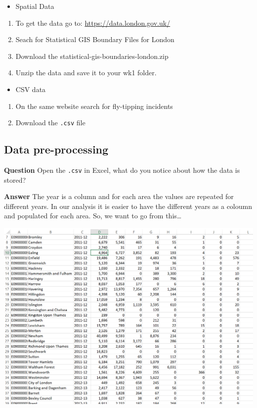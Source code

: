 \documentclass[]{book}
\providecommand{\tightlist}{%
  \setlength{\itemsep}{0pt}\setlength{\parskip}{0pt}}
\begin{document}
\begin{itemize}
\tightlist
\item
  Spatial Data
\end{itemize}

\begin{enumerate}
\def\labelenumi{\arabic{enumi}.}
\item
  To get the data go to: \url{https://data.london.gov.uk/}
\item
  Seach for Statistical GIS Boundary Files for London
\item
  Download the statistical-gis-boundaries-london.zip
\item
  Unzip the data and save it to your wk1 folder.
\end{enumerate}

\begin{itemize}
\tightlist
\item
  CSV data
\end{itemize}

\begin{enumerate}
\def\labelenumi{\arabic{enumi}.}
\item
  On the same website search for fly-tipping incidents
\item
  Download the \texttt{.csv} file
\end{enumerate}

\hypertarget{data-pre-processing}{%
\subsection{Data pre-processing}\label{data-pre-processing}}

\textbf{Question} Open the \texttt{.csv} in Excel, what do you notice about how the data is stored?

\textbf{Answer} The year is a column and for each area the values are repeated for different years. In our analysis it is easier to have the different years as a coloumn and populated for each area. So, we want to go from this\ldots{}

\begin{center}\includegraphics[width=600pt]{prac1_images/csv_original} \end{center}
\end{document}

